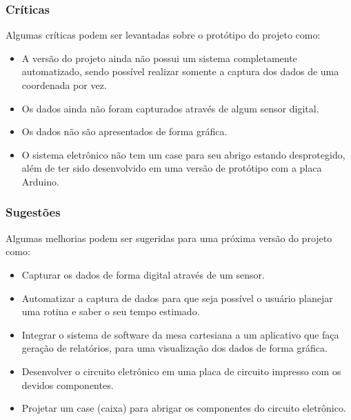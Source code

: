 \begin{frame}
\frametitle{Críticas}
Algumas críticas podem ser levantadas sobre o protótipo do projeto como:
\begin{itemize}
    \item A versão do projeto ainda não possui um sistema completamente automatizado, sendo possível realizar somente a captura dos dados de uma coordenada por vez.
    \item Os dados ainda não foram capturados através de algum sensor digital.
    \item Os dados não são apresentados de forma gráfica.
    \item O sistema eletrônico não tem um case para seu abrigo estando desprotegido, além de ter sido desenvolvido em uma versão de protótipo com a placa Arduino. 
\end{itemize}
\end{frame}

\begin{frame}
\frametitle{Sugestões}
Algumas melhorias podem ser sugeridas para uma próxima versão do projeto como:
\begin{itemize}
    \item Capturar os dados de forma digital através de um sensor.
    \item Automatizar a captura de dados para que seja possível o usuário planejar uma rotina e saber o seu tempo estimado.
    \item Integrar o sistema de software da mesa cartesiana a um aplicativo que faça geração de relatórios, para uma visualização dos dados de forma gráfica.
    \item Desenvolver o circuito eletrônico em uma placa de circuito impresso com os devidos componentes.
    \item Projetar um case (caixa) para abrigar os componentes do circuito eletrônico.
\end{itemize}    
\end{frame}